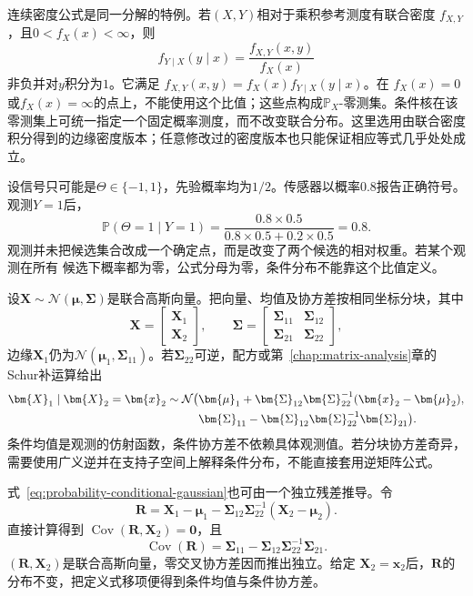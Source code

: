 连续密度公式是同一分解的特例。若\((X,Y)\)相对于乘积参考测度有联合密度
\(f_{X,Y}\)，且\(0<f_X(x)<\infty\)，则
\[
  f_{Y\mid X}(y\mid x)
  =\frac{f_{X,Y}(x,y)}{f_X(x)}
\]
非负并对\(y\)积分为\(1\)。它满足
\(f_{X,Y}(x,y)=f_X(x)f_{Y\mid X}(y\mid x)\)。在
\(f_X(x)=0\)或\(f_X(x)=\infty\)的点上，不能使用这个比值；这些点构成\(\mathbb P_X\)-零测集。条件核在该零测集上可统一指定一个固定概率测度，而不改变联合分布。这里选用由联合密度积分得到的边缘密度版本；任意修改过的密度版本也只能保证相应等式几乎处处成立。

\begin{example}[有限候选经过带噪观测更新]
\label{ex:probability-finite-candidate-bayes}
设信号只可能是\(\Theta\in\{-1,1\}\)，先验概率均为\(1/2\)。传感器以概率\(0.8\)报告正确符号。观测\(Y=1\)后，
\[ \mathbb{P}(\Theta=1\mid Y=1)
  =\frac{0.8\times0.5}{0.8\times0.5+0.2\times0.5}=0.8. \]
观测并未把候选集合改成一个确定点，而是改变了两个候选的相对权重。若某个观测在所有
候选下概率都为零，公式分母为零，条件分布不能靠这个比值定义。
\end{example}
设\(\bm X\sim\mathcal N(\bm\mu,\bm\Sigma)\)是联合高斯向量。把向量、均值及协方差按相同坐标分块，其中
\[
  \bm{X}=
  \begin{bmatrix}\bm{X}_1\\\bm{X}_2\end{bmatrix},
  \qquad
  \bm{\Sigma}=
  \begin{bmatrix}
    \bm{\Sigma}_{11}&\bm{\Sigma}_{12}\\
    \bm{\Sigma}_{21}&\bm{\Sigma}_{22}
  \end{bmatrix},
\]
边缘\(\bm{X}_1\)仍为\(\mathcal{N}(\bm{\mu}_1,\bm{\Sigma}_{11})\)。若\(\bm{\Sigma}_{22}\)可逆，配方或第~\ref{chap:matrix-analysis}章的Schur补运算给出
\begin{align}
  \bm{X}_1\mid\bm{X}_2=\bm{x}_2
  \sim\mathcal{N}\bigl(
  &\bm{\mu}_1+
  \bm{\Sigma}_{12}\bm{\Sigma}_{22}^{-1}
  (\bm{x}_2-\bm{\mu}_2),\notag\\
  &\bm{\Sigma}_{11}
  -\bm{\Sigma}_{12}\bm{\Sigma}_{22}^{-1}
  \bm{\Sigma}_{21}
  \bigr).
  \label{eq:probability-conditional-gaussian}
\end{align}
条件均值是观测的仿射函数，条件协方差不依赖具体观测值。若分块协方差奇异，需要使用广义逆并在支持子空间上解释条件分布，不能直接套用逆矩阵公式。

式~\eqref{eq:probability-conditional-gaussian}也可由一个独立残差推导。令
\[
  \bm{R}
  =\bm{X}_1-\bm{\mu}_1
   -\bm{\Sigma}_{12}\bm{\Sigma}_{22}^{-1}
    (\bm{X}_2-\bm{\mu}_2).
\]
直接计算得到
\(\operatorname{Cov}(\bm{R},\bm{X}_2)=\bm{0}\)，且
\[
  \operatorname{Cov}(\bm{R})
  =\bm{\Sigma}_{11}
   -\bm{\Sigma}_{12}\bm{\Sigma}_{22}^{-1}\bm{\Sigma}_{21}.
\]
\((\bm{R},\bm{X}_2)\)是联合高斯向量，零交叉协方差因而推出独立。给定
\(\bm{X}_2=\bm{x}_2\)后，\(\bm{R}\)的分布不变，把定义式移项便得到条件均值与条件协方差。

